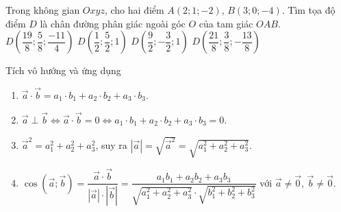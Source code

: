 \begin{ex}%
	Trong không gian $Oxyz$, cho hai điểm $A(2;1;-2)$, $B(3;0;-4)$. Tìm tọa độ điểm $D$ là chân đường phân giác ngoài góc $O$ của tam giác $OAB$.
	\choice
	{$D\left(\dfrac{19}{8};\dfrac{5}{8};\dfrac{-11}{4}\right)$}
	{\True $D\left(\dfrac{1}{2};\dfrac{5}{2};1\right)$}
	{$D\left(\dfrac{9}{2};-\dfrac{3}{2};1\right)$}
	{$D\left(\dfrac{21}{8};\dfrac{3}{8};-\dfrac{13}{8}\right)$}
\end{ex}
\begin{dang}{Tích vô hướng và ứng dụng}
	\begin{enumerate}
		\item $\vec{a}\cdot \vec{b}=a_1\cdot b_1+a_2\cdot b_2+a_3\cdot b_3$.
		\item $\vec{a}\perp \vec{b}\Leftrightarrow \vec{a}\cdot \vec{b}=0\Leftrightarrow a_1\cdot b_1+a_2\cdot b_2+a_3\cdot b_3=0$.
		\item $\vec{a}^2=a_1^2+a_2^2+a_3^2$, suy ra $\left| \vec{a} \right|=\sqrt{\vec{a}^2}=\sqrt{a_1^2+a_2^2+a_3^2}$.
		\item $\cos (\vec{a};\vec{b} )=\dfrac{\vec{a}\cdot \vec{b}}{\left| \vec{a} \right|\cdot \left| \vec{b} \right|}=\dfrac{a_1b_1+a_2b_2+a_3b_3}{\sqrt{a_1^2+a_2^2+a_3^2}\cdot \sqrt{b_1^2+b_2^2+b_3^2}}$ với $\vec{a}\ne \vec{0}$, $\vec{b}\ne \vec{0}$.
		
	\end{enumerate}

\end{dang}
\setcounter{subsubsection}{0}
\setcounter{vd}{0}
\setcounter{bt}{0}
\setcounter{ex}{0}


